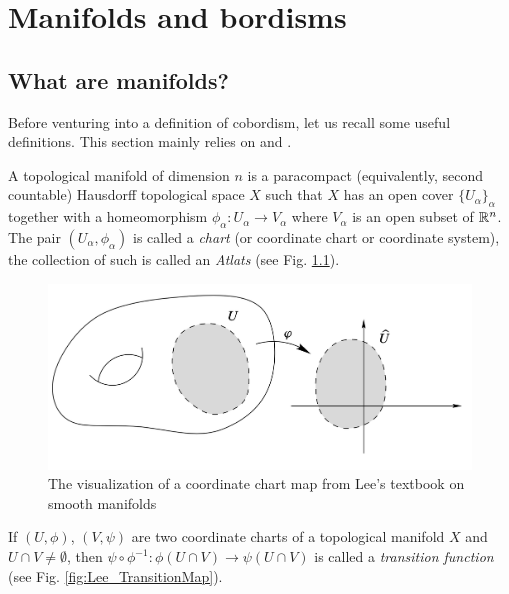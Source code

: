 \chapter{Manifolds and bordisms}

\section{What are manifolds?} %
\label{sec:some_definitions}

Before venturing into a definition of cobordism, let us recall some useful definitions.
This section mainly relies on \cite{Lee2012} and \cite{Hirsch1976}.
\begin{defn}
    A topological manifold of dimension $n$ is a paracompact (equivalently, second countable) Hausdorff topological space $X$ such that $X$ has an open cover $\{U_\alpha\}_\alpha$ together with a homeomorphism $\phi_\alpha:U_\alpha\to V_\alpha$ where $V_\alpha$ is an open subset of $\mathbb{R}^n$. The pair $(U_\alpha, \phi_\alpha)$ is called a \textit{chart} (or coordinate chart or coordinate system), the collection of such is called an \textit{Atlats} (see Fig. \ref{fig:Coordinate_Chart}). 
 \end{defn}
\begin{figure}
    \centering
    \captionsetup{format = hang}
    \includegraphics[width=12cm]{images/Lecture 2/Coordinate Chart.png} 
    \caption{\small{The visualization of a coordinate chart map from Lee's textbook on smooth manifolds \cite{Lee2012}}}
    \label{fig:Coordinate_Chart}
\end{figure}
\noindent If $(U, \phi)$, $(V, \psi)$ are two coordinate charts of a topological manifold $X$ and $U\cap V\neq\emptyset$, then $\psi \circ \phi^{-1} : \phi(U\cap V) \to \psi(U\cap V)$ is called a \textit{transition function} (see Fig. \ref{fig:Lee_TransitionMap}).
